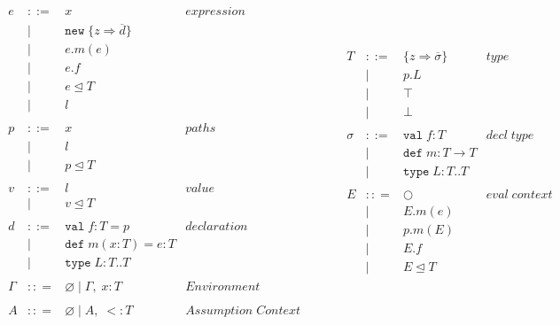 \documentclass[a4paper,UKenglish]{lipics}
\begin{document}
\begin{figure}[h]
\[
\begin{array}{lll}
\begin{array}{lllr}
e & ::= & x & expression \\
& | & \texttt{new} \; \{z \Rightarrow \overline{d}\}&\\
& | & e.m(e) &\\
& | & e.f &\\
& | & e \unlhd T&\\
& | & l &\\
&&\\
p & ::= & x & paths \\
& | & l &\\
& | & p \unlhd T &\\
&&\\
v & ::= & l & value \\
& | & v \unlhd T &\\
&&\\
d & ::= & \texttt{val} \; f : T = p & declaration \\
  & |   & \texttt{def} \; m(x:T) = e : T &\\
  & |   & \texttt{type} \; L : T .. T&\\
&&\\
\Gamma & :: = & \varnothing \; | \; \Gamma,\; x : T & Environment \\
&&\\
A & :: = & \varnothing \; | \; A,\;  <: T & Assumption \; Context \\
 \end{array}
& ~~~~~~
&
\begin{array}{lllr}
T & ::= & \{z \Rightarrow \overline{\sigma}\} & type \\
& | & p.L &\\
& | & \top & \\
& | & \bot & \\
&&\\
\sigma & ::= & \texttt{val} \; f:T & decl \; type\\
       & |   & \texttt{def} \; m:T \rightarrow T \\
		 & |   & \texttt{type} \; L : T .. T &\\
&&\\
E & :: = & \bigcirc & eval \; context\\
       & | & E.m(e)\\
       & | & p.m(E)\\
       & | & E.f\\
       & | & E \unlhd T\\

\end{array}
\end{array}\]
\end{figure}
\end{document}
